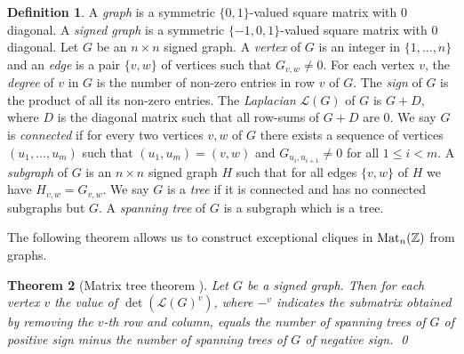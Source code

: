 \documentclass{amsart}
\theoremstyle{plain}
\newtheorem{theorem}{Theorem}[section]
\theoremstyle{definition}
\newtheorem{definition}[theorem]{Definition}
\newcommand{\Z}{\ensuremath{\mathbb{Z}}}
\begin{document}
\begin{definition}
	A \emph{graph} is a symmetric \(\{0,1\}\)-valued square matrix with \(0\) diagonal. 
	A \emph{signed graph} is a symmetric \(\{-1,0,1\}\)-valued square matrix with \(0\) diagonal. 
	Let \(G\) be an \(n\times n\) signed graph.
	A \emph{vertex} of \(G\) is an integer in \(\{1,\dotsc,n\}\) and an \emph{edge} is a pair \(\{v,w\}\) of vertices such that \(G_{v,w}\neq 0\).
	For each vertex \(v\), the \emph{degree} of \(v\) in \(G\) is the number of non-zero entries in row \(v\) of \(G\). 
	The \emph{sign} of \(G\) is the product of all its non-zero entries.
	The \emph{Laplacian} \(\mathcal{L}(G)\) of \(G\) is \(G+D\), where \(D\) is the diagonal matrix such that all row-sums of \(G+D\) are \(0\).
	We say \(G\) is \emph{connected} if for every two vertices \(v,w\) of \(G\) there exists a sequence of vertices \((u_1,\dotsc,u_m)\) such that \((u_1,u_m)=(v,w)\) and \(G_{u_i,u_{i+1}}\neq 0\) for all \(1\leq i <m\).
	A \emph{subgraph} of \(G\) is an \(n\times n\) signed graph \(H\) such that for all edges \(\{v,w\}\) of \(H\) we have \(H_{v,w}=G_{v,w}\).
	We say \(G\) is a \emph{tree} if it is connected and has no connected subgraphs but \(G\).
	A \emph{spanning tree} of \(G\) is a subgraph which is a tree. 
\end{definition}

The following theorem allows us to construct exceptional cliques in \(\textup{Mat}_n(\Z)\) from graphs.

\begin{theorem}[Matrix tree theorem \cite{MatrixTree}]\label{thm:matrix_tree}
	Let \(G\) be a signed graph. Then for each vertex \(v\) the value of \(\det(\mathcal{L}(G)^v)\), where \(-^{v}\) indicates the submatrix obtained by removing the \(v\)-th row and column, equals the number of spanning trees of \(G\) of positive sign minus the number of spanning trees of \(G\) of negative sign. \qed
\end{theorem}
\end{document}
